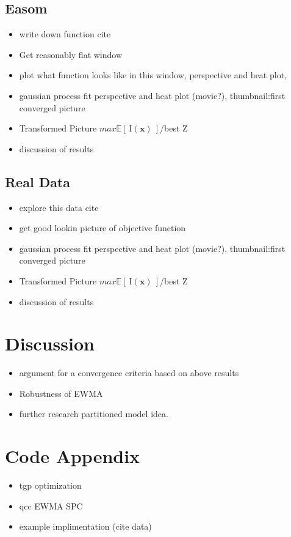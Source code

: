 \documentclass[12pt]{article}
\def \EIx {
	\mathbb{E}\left[~\text{I}(\bm{x})~\right]
}
\begin{document}
	\subsection{Easom}
		\begin{itemize}
		\item write down function {\color{red} cite}
		\item Get reasonably flat window 
		\item plot what function looks like in this window, perspective and heat plot,
		\item gaussian process fit perspective and heat plot {\color{red}(movie?), thumbnail:first converged picture}%
		\item Transformed Picture $max\EIx$/best Z
		\item discussion of results
		\end{itemize}
	
	\subsection{Real Data}
		\begin{itemize}
		\item explore this data {\color{red} cite}
		\item get good lookin picture of objective function
		\item gaussian process fit perspective and heat plot {\color{red}(movie?), thumbnail:first converged picture}%
		\item Transformed Picture $max\EIx$/best Z
		\item discussion of results
		\end{itemize}

\section{Discussion}
	\begin{itemize}
	\item argument for a convergence criteria based on above results
	\item Robustness of EWMA \cite{boxBook}
	\item further research partitioned model idea.
	\end{itemize}
	
\section{Code Appendix}
	\begin{itemize}
	\item tgp optimization \cite{tgp2}
	\item qcc EWMA SPC \cite{qccPack}
	\item example implimentation (cite data)
	\end{itemize}
	
\end{document}

